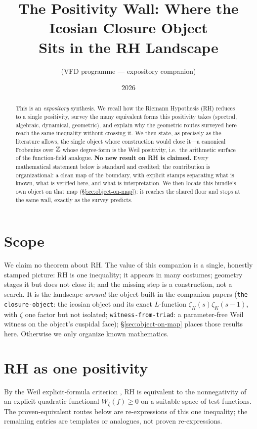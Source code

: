 \documentclass[11pt]{article}
\title{The Positivity Wall: Where the Icosian Closure Object\\ Sits in the RH Landscape}
\author{(VFD programme --- expository companion)}
\date{2026}
\newcommand{\zetaK}{\zeta_{K}}\newcommand{\F}{\mathbb{F}}
\begin{document}
\maketitle

\begin{abstract}
This is an \emph{expository} synthesis. We recall how the Riemann Hypothesis (RH)
reduces to a single positivity, survey the many equivalent forms this positivity
takes (spectral, algebraic, dynamical, geometric), and explain why the geometric routes
surveyed here reach the same inequality without crossing it. We then state,
as precisely as the literature allows, the single object whose construction would
close it---a canonical Frobenius over $\mathbb{Z}$ whose degree-form is the Weil positivity,
i.e.\ the arithmetic surface of the function-field analogue. \textbf{No new result on
RH is claimed.} Every mathematical statement below is standard and credited; the
contribution is organizational: a clean map of the boundary, with explicit stamps
separating what is known, what is verified here, and what is interpretation. We then
locate this bundle's own object on that map (\S\ref{sec:object-on-map}): it reaches the
shared floor and stops at the same wall, exactly as the survey predicts.
\end{abstract}

\section{Scope}
We claim no theorem about RH. The value of this companion is a single, honestly stamped
picture: RH is one inequality; it appears in many costumes; geometry stages it but
does not close it; and the missing step is a construction, not a search. It is the
landscape \emph{around} the object built in the companion papers
(\texttt{the-closure-object}: the icosian object and its exact $L$-function
$\zetaK(s)\zetaK(s-1)$, with $\zeta$ one factor but not isolated;
\texttt{witness-from-triad}: a parameter-free Weil witness on the object's cuspidal
face); \S\ref{sec:object-on-map} places those results here. Otherwise we only organize
known mathematics.

\section{RH as one positivity}
By the Weil explicit-formula criterion \cite{Weil}, RH is equivalent to the
nonnegativity of an explicit quadratic functional $W_\zeta(f)\ge 0$ on a suitable space
of test functions. The proven-equivalent routes below are re-expressions of this one
inequality; the remaining entries are templates or analogues, not proven re-expressions.
\end{document}
